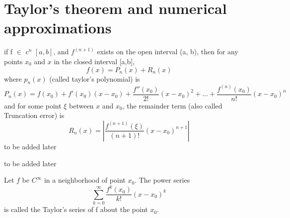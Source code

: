 \documentclass[../Main.tex]{subfiles}
\begin{document}


\section{Taylor's theorem and numerical approximations}

{ if f $\in$ $c^n$ $[a,b]$, and $f^{(n+1)}$ exists on the open interval (a, b), then for any points $x_0$ and $x$ in the closed interval [a,b],
	\begin{equation}
		f(x) = P_n(x) + R_n(x)
	\end{equation}
	where $p_n(x)$ (called taylor's polynomial) is
	\begin{equation}
		P_n(x) = f(x_0) + f'(x_0)(x-x_0) + \frac{f''(x_0)}{2!}(x-x_0)^2 + \dots + \frac{f^{(n)}(x_0)}{n!}(x-x_0)^n
	\end{equation}
	and for some point $\xi$ between $x$ and $x_0$, the remainder term (also called Truncation error) is
	\begin{equation}
		R_n(x) = \left |{\frac{f^{(n+1)}(\xi)}{(n+1)!}(x-x_0)^{n+1}}\right |
	\end{equation}
}{to be added later}


{ to be added later}

{Let $f$ be $C^\infty$ in a neighborhood of point $x_0$. The power series
	\begin{equation}
		\sum_{k=0}^{\infty} \frac{f^k(x_0)}{k!}(x-x_0)^k
	\end{equation}
	is called the Taylor's series of f about the point $x_0$.
}
\end{document}
